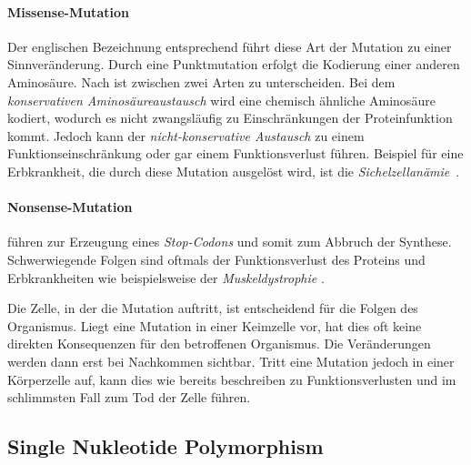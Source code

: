 \paragraph{Missense-Mutation} Der englischen Bezeichnung entsprechend führt diese Art der Mutation zu einer Sinnveränderung. Durch eine Punktmutation erfolgt die Kodierung einer anderen Aminosäure. Nach \citet{Rump2009} ist zwischen zwei Arten zu unterscheiden. Bei dem \textit{konservativen Aminosäureaustausch} wird eine chemisch ähnliche Aminosäure kodiert, wodurch es nicht zwangsläufig zu Einschränkungen der Proteinfunktion kommt. Jedoch kann der \textit{nicht-konservative Austausch} zu einem Funktionseinschränkung oder gar einem Funktionsverlust führen. Beispiel für eine Erbkrankheit, die durch diese Mutation ausgelöst wird, ist die \textit{Sichelzellanämie}~\citep{Rump2009}.

\paragraph{Nonsense-Mutation} führen zur Erzeugung eines \textit{Stop-Codons} und somit zum Abbruch der Synthese. Schwerwiegende Folgen sind oftmals der Funktionsverlust des Proteins und Erbkrankheiten wie beispielsweise der \textit{Muskeldystrophie} \citep{Rump2009}.

Die Zelle, in der die Mutation auftritt, ist entscheidend für die Folgen des Organismus. Liegt eine Mutation in einer Keimzelle vor, hat dies oft keine direkten Konsequenzen für den betroffenen Organismus. Die Veränderungen werden dann erst bei Nachkommen sichtbar. Tritt eine Mutation jedoch in einer Körperzelle auf, kann dies wie bereits beschreiben zu Funktionsverlusten und im schlimmsten Fall zum Tod der Zelle führen.
\subsection{Single Nukleotide Polymorphism}
\label{sec:bio:muta:snp}

